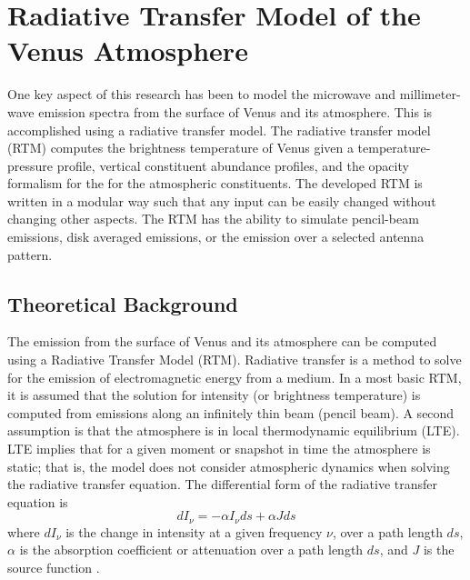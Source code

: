\chapter{Radiative Transfer Model of the Venus Atmosphere}


One key aspect of this research has been to model the microwave and millimeter-wave emission spectra from the surface of Venus and its atmosphere. This is accomplished using a radiative transfer model. The radiative transfer model (RTM) computes the brightness temperature of Venus given a temperature-pressure profile, vertical constituent abundance profiles, and the opacity formalism for the for the atmospheric constituents. The developed RTM is written in a modular way such that any input can be easily changed without changing other aspects. The RTM has the ability to simulate pencil-beam emissions, disk averaged emissions, or the emission over a selected antenna pattern. %

\section{Theoretical Background}

The emission from the surface of Venus and its atmosphere can be computed using a Radiative Transfer Model (RTM). Radiative transfer is a method to solve for the emission of electromagnetic energy from a medium. In a most basic RTM, it is assumed that the solution for intensity (or brightness temperature) is computed from emissions along an infinitely thin beam (pencil beam). A second assumption is that the atmosphere is in local thermodynamic equilibrium (LTE). LTE implies that for a given moment or snapshot in time the atmosphere is static; that is, the model does not consider atmospheric dynamics when solving the radiative transfer equation. The differential form of the radiative transfer equation is
\begin{equation}\label{eq:rtm-diff}
dI_{\nu}= -\alpha I_{\nu }ds + \alpha J ds
\end{equation}
where $dI_\nu$ is the change in intensity at a given frequency $\nu$, over a path length $ds$, $\alpha$ is the absorption coefficient or attenuation over a path length $ds$, and $J$ is the source function \cite{Liou-2002}. 

